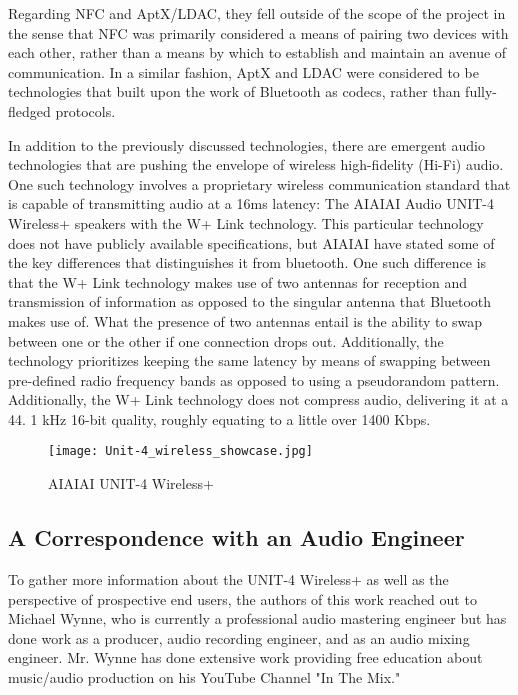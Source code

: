\documentclass[conference]{IEEEtran}
\begin{document}
Regarding NFC and AptX/LDAC, they fell outside of the scope of the project in the sense that NFC was primarily considered a means of pairing two devices with each other, rather than a means by which to establish and maintain an avenue of communication. In a similar fashion, AptX and LDAC were considered to be technologies that built upon the work of Bluetooth as codecs, rather than fully-fledged protocols. \cite{parks_wireless_2013}

In addition to the previously discussed technologies, there are emergent audio technologies
that are pushing the envelope of wireless high-fidelity (Hi-Fi) audio. One such technology
involves a proprietary wireless communication standard that is capable of transmitting audio
at a 16ms latency: The AIAIAI Audio UNIT-4 Wireless+ speakers with the W+ Link technology.
This particular technology does not have publicly available specifications, but AIAIAI have
stated some of the key differences that distinguishes it from bluetooth. One such difference
is that the W+ Link technology makes use of two antennas for reception and transmission of
information as opposed to the singular antenna that Bluetooth makes use of. What the presence
of two antennas entail is the ability to swap between one or the other if one connection
drops out. Additionally, the technology prioritizes keeping the same latency by means of
swapping between pre-defined radio frequency bands as opposed to using a pseudorandom
pattern. Additionally, the W+ Link technology does not compress audio, delivering it at a 44.
1 kHz 16-bit quality, roughly equating to a little over 1400 Kbps.\cite{noauthor_unit-4_2023}

\begin{figure}[htbp]
    \centering
    \texttt{[image: Unit-4\_wireless\_showcase.jpg]}
    \caption{AIAIAI UNIT-4 Wireless+ \cite{noauthor_unit-4_2023}}
    \label{fig:unit-4_productPic}
\end{figure}

\subsection*{A Correspondence with an Audio Engineer}

To gather more information about the UNIT-4 Wireless+ as well as the perspective of prospective
end users, the authors of this work reached out to Michael Wynne, who is currently a professional
audio mastering engineer but has done work as a producer, audio recording engineer, and as an
audio mixing engineer. Mr. Wynne has done extensive work providing free education about
music/audio production on his YouTube Channel "In The Mix." \cite{wynne_i_nodate}
\end{document}
